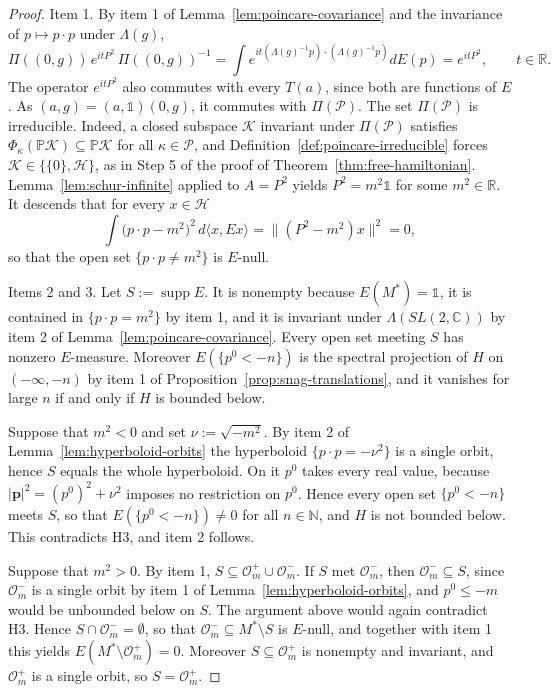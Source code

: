 \begin{proof}
	Item 1. By item 1 of Lemma~\ref{lem:poincare-covariance} and the invariance of $p\mapsto p\cdot p$ under $\Lambda(g)$,
	\begin{equation*}
		\Pi((0,g))\,e^{itP^2}\,\Pi((0,g))^{-1}=\int e^{it(\Lambda(g)^{-1}p)\cdot(\Lambda(g)^{-1}p)}dE(p)=e^{itP^2}, \qquad t\in\mathbb{R}.
	\end{equation*}
	The operator $e^{itP^2}$ also commutes with every $T(a)$, since both are functions of $E$. As $(a,g)=(a,\mathbb{1})(0,g)$, it commutes with $\Pi(\mathcal{P})$. The set $\Pi(\mathcal{P})$ is irreducible. Indeed, a closed subspace $\mathcal{K}$ invariant under $\Pi(\mathcal{P})$ satisfies $\Phi_\kappa(\mathbb{P}\mathcal{K})\subseteq\mathbb{P}\mathcal{K}$ for all $\kappa\in\mathcal{P}$, and Definition~\ref{def:poincare-irreducible} forces $\mathcal{K}\in\{\{0\},\mathcal{H}\}$, as in Step 5 of the proof of Theorem~\ref{thm:free-hamiltonian}. Lemma~\ref{lem:schur-infinite} applied to $A=P^2$ yields $P^2=m^2\mathbb{1}$ for some $m^2\in\mathbb{R}$. It descends that for every $x\in\mathcal{H}$
	\begin{equation*}
		\int\big(p\cdot p-m^2\big)^2\,d\langle x,Ex\rangle=\big\|(P^2-m^2)x\big\|^2=0,
	\end{equation*}
	so that the open set $\{p\cdot p\neq m^2\}$ is $E$-null.
	
	Items 2 and 3. Let $S:=\operatorname{supp}E$. It is nonempty because $E(M^*)=\mathbb{1}$, it is contained in $\{p\cdot p=m^2\}$ by item 1, and it is invariant under $\Lambda(SL(2,\mathbb{C}))$ by item 2 of Lemma~\ref{lem:poincare-covariance}. Every open set meeting $S$ has nonzero $E$-measure. Moreover $E(\{p^0<-n\})$ is the spectral projection of $H$ on $(-\infty,-n)$ by item 1 of Proposition~\ref{prop:snag-translations}, and it vanishes for large $n$ if and only if $H$ is bounded below.
	
	Suppose that $m^2<0$ and set $\nu:=\sqrt{-m^2}$. By item 2 of Lemma~\ref{lem:hyperboloid-orbits} the hyperboloid $\{p\cdot p=-\nu^2\}$ is a single orbit, hence $S$ equals the whole hyperboloid. On it $p^0$ takes every real value, because $|\mathbf{p}|^2=(p^0)^2+\nu^2$ imposes no restriction on $p^0$. Hence every open set $\{p^0<-n\}$ meets $S$, so that $E(\{p^0<-n\})\neq0$ for all $n\in\mathbb{N}$, and $H$ is not bounded below. This contradicts H3, and item 2 follows.
	
	Suppose that $m^2>0$. By item 1, $S\subseteq\mathcal{O}_m^+\cup\mathcal{O}_m^-$. If $S$ met $\mathcal{O}_m^-$, then $\mathcal{O}_m^-\subseteq S$, since $\mathcal{O}_m^-$ is a single orbit by item 1 of Lemma~\ref{lem:hyperboloid-orbits}, and $p^0\leq-m$ would be unbounded below on $S$. The argument above would again contradict H3. Hence $S\cap\mathcal{O}_m^-=\emptyset$, so that $\mathcal{O}_m^-\subseteq M^*\setminus S$ is $E$-null, and together with item 1 this yields $E(M^*\setminus\mathcal{O}_m^+)=0$. Moreover $S\subseteq\mathcal{O}_m^+$ is nonempty and invariant, and $\mathcal{O}_m^+$ is a single orbit, so $S=\mathcal{O}_m^+$.
\end{proof}


